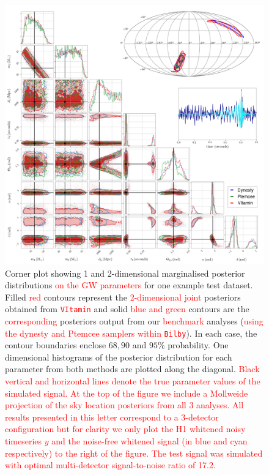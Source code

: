 \documentclass[%
showpacs,
nofootinbib,
 amsmath,amssymb,
 aps,
 twocolumn,
 prl,
 reprint,
floatfix,
]{revtex4-1}
\newcommand{\new}[1]{\textcolor{red}{#1}}
\begin{document}
%
%
\begin{figure}
    \includegraphics[width=\textwidth]{corner_testcase0.png}
    \caption{\label{fig:corner_plot} Corner plot showing 1 and 2-dimensional
marginalised posterior distributions \new{on the \ac{GW} parameters} for one
example test dataset. Filled \new{red} contours represent the
\new{2-dimensional joint} posteriors obtained from \new{\texttt{VItamin}} and
solid \new{blue and green} contours are the \new{corresponding} posteriors
output from our \new{benchmark} analyses (\new{using the dynesty and Ptemcee
samplers within \texttt{Bilby}}). In each case, the contour boundaries enclose
$68,90$ and $95\%$ probability. One dimensional histograms of the posterior
distribution for each parameter from both methods are plotted along the
diagonal. \new{Black vertical and horizontal lines denote the true parameter
values of the simulated signal. At the top of the figure we include a Mollweide
projection of the sky location posteriors from all 3 analyses. All results
presented in this letter correspond to a 3-detector configuration but for
clarity we only plot the H1 whitened noisy timeseries $y$ and the noise-free
whitened signal (in blue and cyan respectively) to the right of the figure. The
test signal was simulated with optimal multi-detector signal-to-noise ratio of
17.2.}} 
\end{figure}
\end{document}
